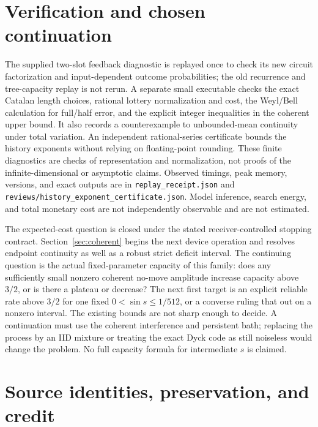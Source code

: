 \documentclass[11pt]{article}
\begin{document}
\section{Verification and chosen continuation}

The supplied two-slot feedback diagnostic is replayed once to check its new circuit factorization and input-dependent outcome probabilities; the old recurrence and tree-capacity replay is not rerun. A separate small executable checks the exact Catalan length choices, rational lottery normalization and cost, the Weyl/Bell calculation for full/half error, and the explicit integer inequalities in the coherent upper bound. It also records a counterexample to unbounded-mean continuity under total variation. An independent rational-series certificate bounds the history exponents without relying on floating-point rounding. These finite diagnostics are checks of representation and normalization, not proofs of the infinite-dimensional or asymptotic claims. Observed timings, peak memory, versions, and exact outputs are in \texttt{replay\_receipt.json} and \texttt{reviews/history\_exponent\_certificate.json}. Model inference, search energy, and total monetary cost are not independently observable and are not estimated.

The expected-cost question is closed under the stated receiver-controlled stopping contract. Section~\ref{sec:coherent} begins the next device operation and resolves endpoint continuity as well as a robust strict deficit interval. The continuing question is the actual fixed-parameter capacity of this family: does any sufficiently small nonzero coherent no-move amplitude increase capacity above $3/2$, or is there a plateau or decrease? The next first target is an explicit reliable rate above $3/2$ for one fixed $0<\sin s\le1/512$, or a converse ruling that out on a nonzero interval. The existing bounds are not sharp enough to decide. A continuation must use the coherent interference and persistent bath; replacing the process by an IID mixture or treating the exact Dyck code as still noiseless would change the problem. No full capacity formula for intermediate $s$ is claimed.

\appendix
\section{Source identities, preservation, and credit}
\end{document}
